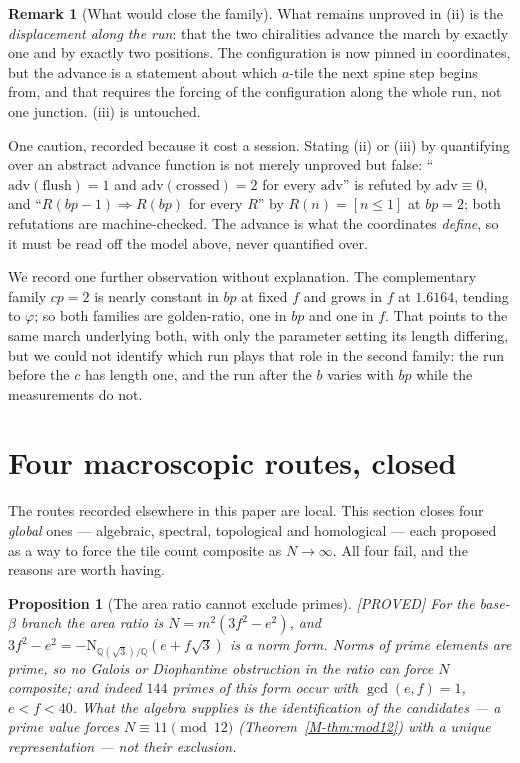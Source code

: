 \documentclass[11pt,reqno]{amsart}
\theoremstyle{plain}
\newtheorem{proposition}[theorem]{Proposition}
\theoremstyle{definition}
\newtheorem{remark}[theorem]{Remark}
\newcommand{\lab}[1]{\hfill\textnormal{\footnotesize\textsc{[#1]}}}
\begin{document}
\begin{remark}[What would close the family]
What remains unproved in (ii) is the \emph{displacement along the run}: that the two chiralities
advance the march by exactly one and by exactly two positions. The configuration is now pinned in
coordinates, but the advance is a statement about which $a$-tile the next spine step begins from,
and that requires the forcing of the configuration along the whole run, not one junction. (iii) is
untouched.

One caution, recorded because it cost a session. Stating (ii) or (iii) by quantifying over an
abstract advance function is not merely unproved but false: ``$\mathrm{adv}(\text{flush})=1$ and
$\mathrm{adv}(\text{crossed})=2$ for every $\mathrm{adv}$'' is refuted by $\mathrm{adv}\equiv 0$, and
``$R(bp-1)\Rightarrow R(bp)$ for every $R$'' by $R(n)=[n\le 1]$ at $bp=2$; both refutations are
machine-checked. The advance is what the coordinates \emph{define}, so it must be read off the model
above, never quantified over.
\end{remark}

We record one further observation without explanation. The complementary family $cp=2$ is nearly
constant in $bp$ at fixed $f$ and grows in $f$ at $1.6164$, tending to $\varphi$; so both families
are golden-ratio, one in $bp$ and one in $f$. That points to the same march underlying both, with
only the parameter setting its length differing, but we could not identify which run plays that role
in the second family: the run before the $c$ has length one, and the run after the $b$ varies with
$bp$ while the measurements do not.

\section{Four macroscopic routes, closed}\label{sec:macro}

The routes recorded elsewhere in this paper are local. This section closes four \emph{global}
ones --- algebraic, spectral, topological and homological --- each proposed as a way to force the
tile count composite as $N\to\infty$. All four fail, and the reasons are worth having.

\begin{proposition}[The area ratio cannot exclude primes]\label{prop:norm}\lab{PROVED}
For the base-$\beta$ branch the area ratio is $N=m^{2}(3f^{2}-e^{2})$, and
$3f^{2}-e^{2}=-\mathrm{N}_{\mathbb Q(\sqrt3)/\mathbb Q}(e+f\sqrt3)$ is a norm form. Norms of prime
elements are prime, so no Galois or Diophantine obstruction in the ratio can force $N$ composite;
and indeed $144$ primes of this form occur with $\gcd(e,f)=1$, $e<f<40$. What the algebra supplies
is the \emph{identification} of the candidates --- a prime value forces $N\equiv11\pmod{12}$
(Theorem~\ref{M-thm:mod12}) with a unique representation --- not their exclusion.
\end{proposition}
\end{document}
